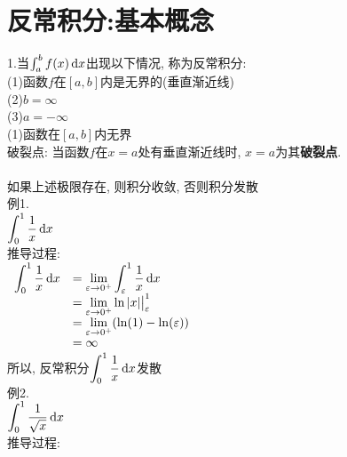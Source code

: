 \chapter{反常积分:基本概念}
1.当$\int_a^bf(x)\mathop{}\!\mathrm{d} x$出现以下情况, 称为反常积分:\\
(1)函数$f$在$[a,b]$内是无界的(垂直渐近线)\\
(2)$b=\infty$\\
(3)$a=-\infty$\\[2ex]

(1)函数在$[a,b]$内无界\\
破裂点: 当函数$f$在$x=a$处有垂直渐近线时, $x=a$为其\textbf{破裂点}.\\[2ex]
\\
如果上述极限存在, 则积分收敛, 否则积分发散\\
例1.\\
$\displaystyle\int_0^1\frac{1}{x}\mathop{}\!\mathrm{d} x$\\
推导过程:\\
$\begin{array}{>{\displaystyle}r >{\displaystyle}l}
\int_0^1\frac{1}{x}\dif x & =\lim_{\varepsilon\to 0^+}\int_{\varepsilon}^1\frac{1}{x}\dif x\\
& =\lim_{\varepsilon\to 0^+}\ln|x|\big|_{\varepsilon}^1\\
& =\lim_{\varepsilon\to 0^+}(\ln(1)-\ln(\varepsilon))\\
& =\infty
\end{array}$\\
所以, 反常积分$\displaystyle\int_0^1\frac{1}{x}\mathop{}\!\mathrm{d} x$发散\\[2ex]

例2.\\
$\displaystyle\int_0^1\frac{1}{\sqrt{x}}\mathop{}\!\mathrm{d} x$\\
推导过程:\\

